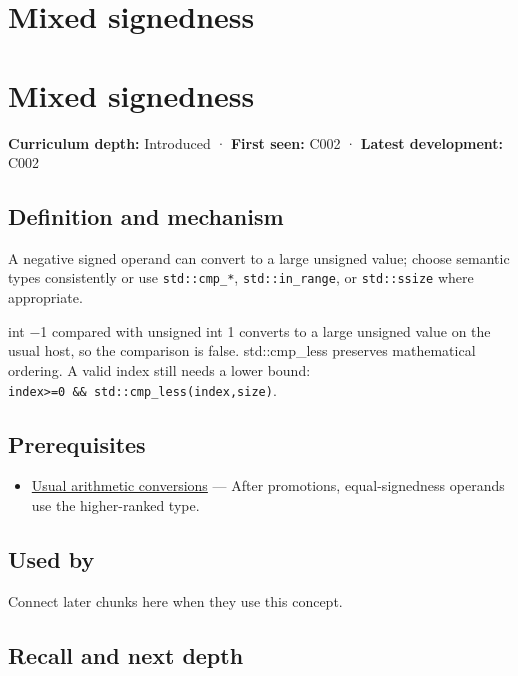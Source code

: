 \hypertarget{appendix-736a2345de4a}{}
\section*{Mixed signedness}
\section{Mixed signedness}\label{appendix-736a2345de4a-mixed-signedness}

\textbf{Curriculum depth:} Introduced · \textbf{First seen:} C002 · \textbf{Latest development:} C002

\subsection{Definition and mechanism}\label{appendix-736a2345de4a-definition-and-mechanism}

A negative signed operand can convert to a large unsigned value; choose semantic types consistently or use \texttt{std::cmp\_*}, \texttt{std::in\_range}, or \texttt{std::ssize} where appropriate.

int −1 compared with unsigned int 1 converts to a large unsigned value on the usual host, so the comparison is false. std::cmp\_less preserves mathematical ordering. A valid index still needs a lower bound: \texttt{index\textgreater{}=0\ \&\&\ std::cmp\_less(index,size)}.

\subsection{Prerequisites}\label{appendix-736a2345de4a-prerequisites}

\begin{itemize}
\tightlist
\item
  \hyperref[appendix-5e2d663adf7f]{Usual arithmetic conversions} --- After promotions, equal-signedness operands use the higher-ranked type.
\end{itemize}

\subsection{Used by}\label{appendix-736a2345de4a-used-by}

Connect later chunks here when they use this concept.

\subsection{Recall and next depth}\label{appendix-736a2345de4a-recall-and-next-depth}

